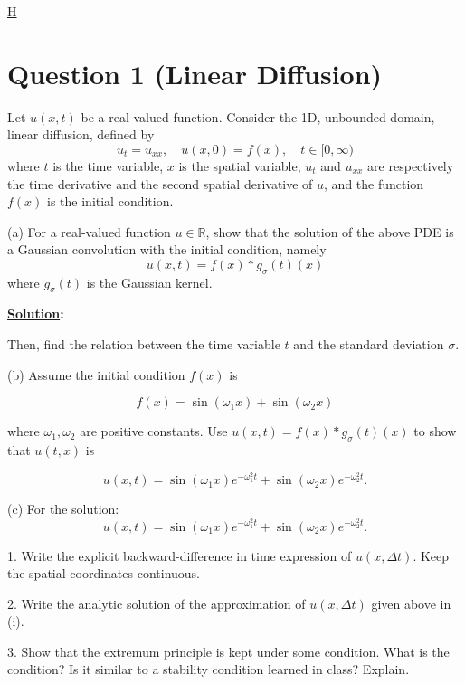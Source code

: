 \documentclass{article}
\begin{document}
\begin{center}
{\huge \underline{H}}
\end{center}

\section{Question 1 (Linear Diffusion)}
Let $u(x,t)$ be a real-valued function. Consider the 1D, unbounded domain, linear diffusion, defined by
\begin{equation}
u_t = u_{xx}, \quad u(x,0) = f(x), \quad t \in [0, \infty)
\end{equation}
where \(t\) is the time variable, \(x\) is the spatial variable, \(u_t\) and \(u_{xx}\) are respectively the time derivative and the second spatial derivative of \(u\), and the function \(f(x)\) is the initial condition.

(a) For a real-valued function \(u \in \mathbb{R}\), show that the solution of the above PDE is a Gaussian convolution with the initial condition, namely
\begin{equation}
u(x,t) = f(x) * g_\sigma(t)(x)
\end{equation}
where \(g_\sigma(t)\) is the Gaussian kernel.

\textbf{\ul{Solution}:} 



Then, find the relation between the time variable \(t\) and the standard deviation \(\sigma\).

(b) Assume the initial condition \(f(x)\) is

\begin{equation}
f(x) = \sin(\omega_1 x) + \sin(\omega_2 x)
\end{equation}

where \(\omega_1, \omega_2\) are positive constants. Use $u(x,t) = f(x) * g_\sigma(t)(x)
 $ to show that \(u(t, x)\) is 

\begin{equation}
u(x,t) = \sin(\omega_1 x)e^{-\omega_1^2 t} + \sin(\omega_2 x)e^{-\omega_2^2 t}.
\end{equation}

(c) For the solution:
\[
  u(x,t) = \sin(\omega_1 x)e^{-\omega_1^2 t} + \sin(\omega_2 x)e^{-\omega_2^2 t}.
\]

1. Write the explicit backward-difference in time expression of \(u(x, \Delta t)\). Keep the spatial coordinates continuous.

2. Write the analytic solution of the approximation of \(u(x, \Delta t)\) given above in (i).

3. Show that the extremum principle is kept under some condition. What is the condition? Is it similar to a stability condition learned in class? Explain.
\end{document}

